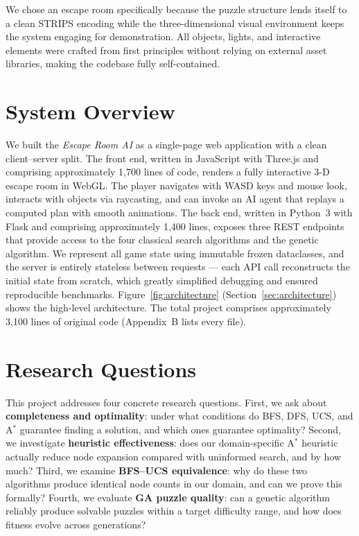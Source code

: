 \documentclass[12pt, a4paper]{report}
\begin{document}
We chose an escape room specifically because the puzzle structure lends itself
to a clean STRIPS encoding while the three-dimensional visual environment keeps
the system engaging for demonstration.  All objects, lights, and interactive
elements were crafted from first principles without relying on external asset
libraries, making the codebase fully self-contained.

\section{System Overview}

We built the \textit{Escape Room AI} as a single-page web application with a clean client--server split.  The front end, written in JavaScript with Three.js and comprising approximately 1,700 lines of code, renders a fully interactive 3-D escape room in WebGL.  The player navigates with WASD keys and mouse look, interacts with objects via raycasting, and can invoke an AI agent that replays a computed plan with smooth animations.  The back end, written in Python~3 with Flask and comprising approximately 1,400 lines, exposes three REST endpoints that provide access to the four classical search algorithms and the genetic algorithm.  We represent all game state using immutable frozen dataclasses, and the server is entirely stateless between requests --- each API call reconstructs the initial state from scratch, which greatly simplified debugging and ensured reproducible benchmarks.  Figure~\ref{fig:architecture} (Section~\ref{sec:architecture}) shows the high-level architecture.  The total project comprises approximately 3,100 lines of original code (Appendix~B lists every file).

\section{Research Questions}

This project addresses four concrete research questions.  First, we ask about \textbf{completeness and optimality}: under what conditions do BFS, DFS, UCS, and A$^{\ast}$ guarantee finding a solution, and which ones guarantee optimality?  Second, we investigate \textbf{heuristic effectiveness}: does our domain-specific A$^{\ast}$ heuristic actually reduce node expansion compared with uninformed search, and by how much?  Third, we examine \textbf{BFS--UCS equivalence}: why do these two algorithms produce identical node counts in our domain, and can we prove this formally?  Fourth, we evaluate \textbf{GA puzzle quality}: can a genetic algorithm reliably produce solvable puzzles within a target difficulty range, and how does fitness evolve across generations?
\end{document}
